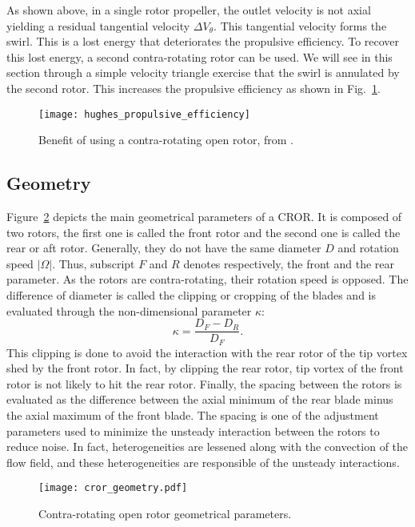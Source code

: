 
As shown above, in a single rotor propeller, the outlet velocity is not axial
yielding a residual tangential velocity $\Delta V_{\theta}$. 
This tangential velocity forms the swirl. 
This is a lost energy that deteriorates the propulsive efficiency. 
To recover this lost energy, a second contra-rotating rotor can be used.
We will see in this section through a simple velocity triangle exercise that
the swirl is annulated by the second rotor. This increases the propulsive
efficiency as shown in Fig.~\ref{fig:hughes_propulsive_efficiency}.
\begin{figure}[htb]
  \centering
  \texttt{[image: hughes\_propulsive\_efficiency]}
  \caption{Benefit of using a contra-rotating open rotor, from \citet{Hughes1989}.}
  \label{fig:hughes_propulsive_efficiency}
\end{figure}

\subsection{Geometry}
\label{sub:cror_geometry}

Figure~\ref{fig:cror_geometry} depicts the main
geometrical parameters of a CROR.
It is composed of two rotors, the first one is called
the front rotor and the second one is called the rear or aft rotor.
Generally, they do not have the same diameter $D$ and rotation speed
$| \Omega |$. Thus, subscript $F$ and $R$ denotes respectively,
the front and the rear parameter.
As the rotors are contra-rotating, their rotation speed is opposed.
The difference of diameter is called the clipping or cropping
of the blades and is evaluated through the non-dimensional parameter
$\kappa$:
\begin{equation}
    \kappa = \frac{D_F - D_R}{D_F}.
\end{equation}
This clipping is done to avoid the interaction 
with the rear rotor of the tip vortex shed
by the front rotor. In fact, by clipping the rear
rotor, tip vortex of the front rotor is not likely
to hit the rear rotor.
Finally, the spacing between the rotors
is evaluated as the difference between the axial minimum of the
rear blade minus the axial maximum of the front blade. The spacing
is one of the adjustment parameters used to minimize the unsteady
interaction between the rotors to reduce noise. In fact, 
heterogeneities are lessened along with the convection of
the flow field, and these heterogeneities are responsible
of the unsteady interactions.
\begin{figure}[htbp]
  \centering
  \texttt{[image: cror\_geometry.pdf]}
  \caption{Contra-rotating open rotor geometrical parameters.}
  \label{fig:cror_geometry}
\end{figure}

